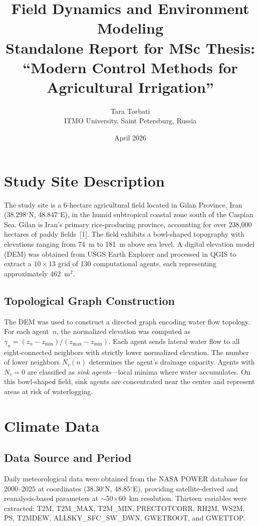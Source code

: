 \documentclass[12pt,a4paper]{article}
\title{\textbf{Field Dynamics and Environment Modeling}\\[0.5em]
\large Standalone Report for MSc Thesis:\\
``Modern Control Methods for Agricultural Irrigation''}
\author{Tara Torbati\\ITMO University, Saint Petersburg, Russia}
\date{April 2026}
\begin{document}
\maketitle
\tableofcontents
\newpage

\section{Study Site Description}

The study site is a 6-hectare agricultural field located in Gilan Province, Iran (38.298$^{\circ}$N, 48.847$^{\circ}$E), in the humid subtropical coastal zone south of the Caspian Sea. Gilan is Iran's primary rice-producing province, accounting for over 238,000 hectares of paddy fields~[1]. The field exhibits a bowl-shaped topography with elevations ranging from 74~m to 181~m above sea level. A digital elevation model (DEM) was obtained from USGS Earth Explorer and processed in QGIS to extract a $10 \times 13$ grid of 130 computational agents, each representing approximately 462~m$^{2}$.

\subsection{Topological Graph Construction}

The DEM was used to construct a directed graph encoding water flow topology. For each agent~$n$, the normalized elevation was computed as $\gamma_n = (z_n - z_{\min})/(z_{\max} - z_{\min})$. Each agent sends lateral water flow to all eight-connected neighbors with strictly lower normalized elevation. The number of lower neighbors $N_r(n)$ determines the agent's drainage capacity. Agents with $N_r = 0$ are classified as \emph{sink agents}---local minima where water accumulates. On this bowl-shaped field, sink agents are concentrated near the center and represent areas at risk of waterlogging.


\section{Climate Data}

\subsection{Data Source and Period}

Daily meteorological data were obtained from the NASA POWER database for 2000--2025 at coordinates (38.30$^{\circ}$N, 48.85$^{\circ}$E), providing satellite-derived and reanalysis-based parameters at $\sim$50$\times$60~km resolution. Thirteen variables were extracted: T2M, T2M\_MAX, T2M\_MIN, PRECTOTCORR, RH2M, WS2M, PS, T2MDEW, ALLSKY\_SFC\_SW\_DWN, GWETROOT, and GWETTOP.
\end{document}
